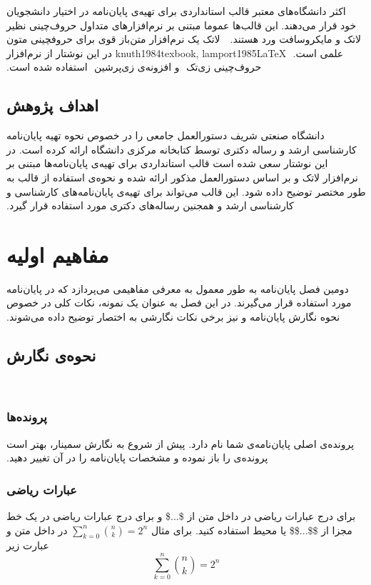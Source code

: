 ‫
‫اکثر دانشگاه‌های معتبر قالب استانداردی برای تهیه‌ی پایان‌نامه در اختیار دانشجویان خود قرار می‌دهند.
‫این قالب‌ها عموما مبتنی بر نرم‌افزارهای متداول حروف‌چینی نظیر لاتک و مایکروسافت ورد هستند.
‫
‫ لاتک یک نرم‌افزار متن‌باز قوی برای حروفچینی متون علمی است.
‫ {knuth1984texbook, lamport1985LaTeX}
‫در این نوشتار از نرم‌افزار حروف‌چینی زی‌تک
‫ و افزونه‌ی زی‌پرشین
‫ استفاده شده است.
‫
‫
‫\subsection{اهداف پژوهش}
‫
‫دانشگاه صنعتی شریف دستورالعمل جامعی را در خصوص
‫نحوه تهیه پایان‌نامه کارشناسی ارشد و رساله دکتری توسط کتابخانه مرکزی دانشگاه ارائه کرده است.
‫در این نوشتار سعی شده است قالب استانداردی برای تهیه‌ی پایان‌نامه‌ها مبتنی بر نرم‌افزار لاتک و
‫بر اساس دستورالعمل مذکور ارائه شده و
‫نحوه‌ی استفاده از قالب به طور مختصر توضیح داده شود.
‫این قالب  می‌تواند برای تهیه‌ی پایان‌نامه‌های کارشناسی و کارشناسی ارشد
‫و همجنین رساله‌ها‌ی دکتری مورد استفاده قرار گیرد.
‫
‫‫
‫\section{مفاهیم اولیه}
‫
‫
‫دومین فصل پایان‌نامه به طور معمول به معرفی مفاهیمی می‌پردازد که در پایان‌نامه مورد استفاده قرار می‌گیرند.
‫در این فصل به عنوان یک نمونه، نکات کلی در خصوص نحوه نگارش پایان‌نامه و
‫نیز برخی نکات نگارشی به اختصار توضیح داده می‌شوند.
‫
‫\subsection{نحوه‌ی نگارش}
‫
‫\subsubsection{پرونده‌ها}
‫
‫پرونده‌ی اصلی پایان‌نامه‌ی شما   نام دارد.
‫پیش از شروع به نگارش سمینار، بهتر است پرونده‌ی  را باز نموده و مشخصات پایان‌نامه را در آن تغییر دهید.
‫
‫
‫\subsubsection{عبارات ریاضی}
‫
‫برای درج عبارات ریاضی در داخل متن از \$...\$ و  برای درج عبارات ریاضی در یک خط مجزا از \$\$...\$\$ یا محیط  استفاده کنید. برای مثال $\sum_{k=0}^{n} {n \choose k} = 2^n$ در داخل متن و عبارت زیر
‫
‫\begin{equation}
‫\sum_{k=0}^{n} {n \choose k} = 2^n
‫\end{equation}
